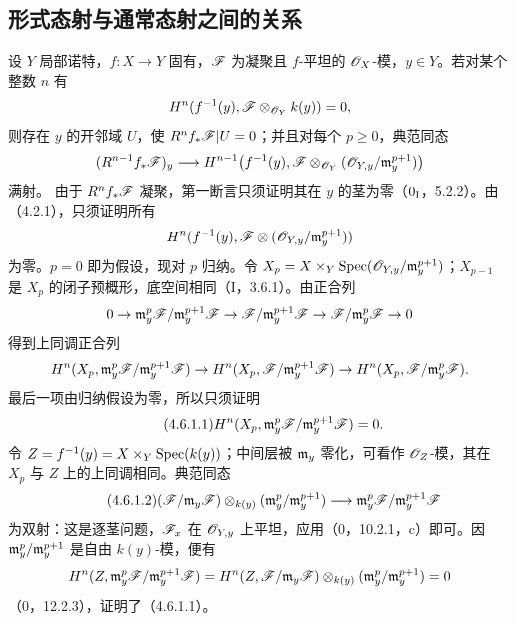 \subsection{形式态射与通常态射之间的关系}
设 $Y$ 局部诺特，$f:X\to Y$ 固有，$\mathscr F$ 为凝聚且 $f$-平坦的 $\mathscr O_X$-模，$y\in Y$。若对某个整数 $n$ 有
\[
H^n(f^{-1}(y),\mathscr F\otimes_{\mathscr O_Y}k(y))=0,
\]
则存在 $y$ 的开邻域 $U$，使 $R^nf_*\mathscr F|U=0$；并且对每个 $p\ge0$，典范同态
\[
(R^{n-1}f_*\mathscr F)_y\longrightarrow
H^{n-1}\!\left(f^{-1}(y),\mathscr F\otimes_{\mathscr O_Y}(\mathscr O_{Y,y}/\mathfrak m_y^{p+1})\right)
\]
满射。
\eproof
由于 $R^nf_*\mathscr F$ 凝聚，第一断言只须证明其在 $y$ 的茎为零（$0_{\mathrm I}$，5.2.2）。由（4.2.1），只须证明所有
\[
H^n(f^{-1}(y),\mathscr F\otimes(\mathscr O_{Y,y}/\mathfrak m_y^{p+1}))
\]
为零。$p=0$ 即为假设，现对 $p$ 归纳。令 $X_p=X\times_Y\operatorname{Spec}(\mathscr O_{Y,y}/\mathfrak m_y^{p+1})$；$X_{p-1}$ 是 $X_p$ 的闭子预概形，底空间相同（I，3.6.1）。由正合列
\[
0\to\mathfrak m_y^p\mathscr F/\mathfrak m_y^{p+1}\mathscr F\to\mathscr F/\mathfrak m_y^{p+1}\mathscr F\to\mathscr F/\mathfrak m_y^p\mathscr F\to0
\]
得到上同调正合列
\[
H^n(X_p,\mathfrak m_y^p\mathscr F/\mathfrak m_y^{p+1}\mathscr F)\to
H^n(X_p,\mathscr F/\mathfrak m_y^{p+1}\mathscr F)\to H^n(X_p,\mathscr F/\mathfrak m_y^p\mathscr F).
\]
最后一项由归纳假设为零，所以只须证明
\begin{equation}\tag{4.6.1.1}H^n(X_p,\mathfrak m_y^p\mathscr F/\mathfrak m_y^{p+1}\mathscr F)=0.\end{equation}
令 $Z=f^{-1}(y)=X\times_Y\operatorname{Spec}(k(y))$；中间层被 $\mathfrak m_y$ 零化，可看作 $\mathscr O_Z$-模，其在 $X_p$ 与 $Z$ 上的上同调相同。典范同态
\begin{equation}\tag{4.6.1.2}
(\mathscr F/\mathfrak m_y\mathscr F)\otimes_{k(y)}(\mathfrak m_y^p/\mathfrak m_y^{p+1})
\longrightarrow\mathfrak m_y^p\mathscr F/\mathfrak m_y^{p+1}\mathscr F
\end{equation}
为双射：这是逐茎问题，$\mathscr F_x$ 在 $\mathscr O_{Y,y}$ 上平坦，应用（0，10.2.1，c）即可。因 $\mathfrak m_y^p/\mathfrak m_y^{p+1}$ 是自由 $k(y)$-模，便有
\[
H^n(Z,\mathfrak m_y^p\mathscr F/\mathfrak m_y^{p+1}\mathscr F)
=H^n(Z,\mathscr F/\mathfrak m_y\mathscr F)\otimes_{k(y)}(\mathfrak m_y^p/\mathfrak m_y^{p+1})=0
\]
（0，12.2.3），证明了（4.6.1.1）。

